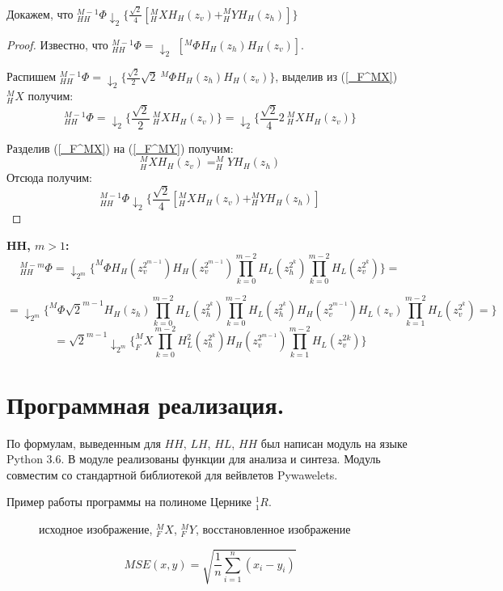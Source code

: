 \documentclass[oneside, final, 14pt]{extreport}
\begin{document}
Докажем, что $_{HH}^{M-1}\Phi\downarrow_2 \{\frac{\sqrt{2}}{4}[_{H}^MX H_H(z_v) + _{H}^MY H_H(z_h)]\}$
\begin{proof}
Известно, что $_{HH}^{M-1}\Phi = \downarrow_2$ $ [^{M}\Phi H_H(z_h)H_H(z_v)]$.

Распишем \begin{math} _{HH}^{M-1}\Phi = \downarrow_2 \{ \frac{\sqrt{2}}{2}\sqrt{2} ~^{M}\Phi H_H(z_h)H_H(z_v) \} \end{math}, выделив из (\ref{_F^MX}) $_H^MX$ получим:
\[
 _{HH}^{M-1}\Phi = \downarrow_2 \{\frac{\sqrt{2}}{2} ~_{H}^MX H_H(z_v)\} = \downarrow_2 \{\frac{\sqrt{2}}{4}2 ~_{H}^MX H_H(z_v)\}
\]

Разделив (\ref{_F^MX}) на (\ref{_F^MY}) получим:
\[
_{H}^MX H_H(z_v) = _{H}^MY H_H(z_h)
\]
Отсюда получим:
\[
_{HH}^{M-1}\Phi\downarrow_2 \{\frac{\sqrt{2}}{4}[_{H}^MX H_H(z_v) + _{H}^MY H_H(z_h)]
\]
\end{proof}

\textbf{HH, $m>1$:}
\[
_{HH}^{M-m}\Phi=\downarrow_{2^m} \{^M\Phi H_H(z_v^{2^{m-1}}) H_H(z_v^{2^{m-1}}) \prod\limits_{k = 0}^{m-2} H_L(z_h^{2^k})
							\prod\limits_{k = 0}^{m-2} H_L(z_v^{2^k})\}=\]
							
\[
=\downarrow_{2^m} \{^M\Phi \sqrt{2}^{m-1} H_H(z_h) \prod \limits_{k=0}^{m-2} H_L(z_h^{2^k})   
\prod \limits_{k=0}^{m-2} H_L(z_h^{2^k}) H_H(z_v^{2^{m-1}})H_L(z_v) \prod \limits _{k=1}^{m-2}H_L(z_v^{2^k})=
  \}
\]
\[
=\sqrt{2}^{m-1} \downarrow_{2^m} \{_F^MX \prod \limits_{k=0}^{m-2} H_L^2(z_h^{2^k}) H_H(z_v^{2^{m-1}}) \prod \limits_{k=1}^{m-2}H_L(z_v^{2k})    \}
\]
\chapter{Программная реализация.}
По формулам, выведенным для $HH$, $LH$, $HL$, $HH$ был написан модуль на языке Python 3.6. В модуле реализованы функции для анализа и синтеза. Модуль совместим со стандартной библиотекой для вейвлетов Pywawelets.

Пример работы программы на полиноме Цернике $_1^1R$.
\begin{figure}[h]
\caption{исходное изображение, $_F^MX$, $_F^MY$, восстановленное изображение }
\end{figure}
\[MSE(x, y) = \sqrt{\frac{1}{n}\sum\limits_{i=1}^{n}(x_i - y_i)}\]
\end{document}
